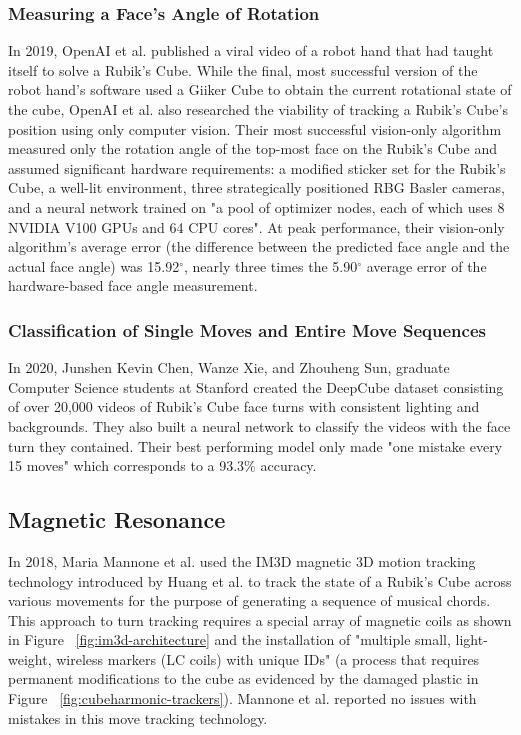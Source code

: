 \subsubsection{Measuring a Face's Angle of Rotation}
In 2019, OpenAI et al. published a viral video of a robot hand that had taught itself to solve a Rubik's Cube.
While the final, most successful version of the robot hand's software used a Giiker Cube to obtain the current rotational state of the cube, OpenAI et al. also researched the viability of tracking a Rubik's Cube's position using only computer vision.
Their most successful vision-only algorithm measured only the rotation angle of the top-most face on the Rubik's Cube and assumed significant hardware requirements: a modified sticker set for the Rubik's Cube, a well-lit environment, three strategically positioned RBG Basler cameras, and a neural network trained on "a pool of optimizer nodes, each of which uses 8 NVIDIA V100 GPUs and 64 CPU cores".
At peak performance, their vision-only algorithm's average error (the difference between the predicted face angle and the actual face angle) was 15.92$^\circ$, nearly three times the 5.90$^\circ$ average error of the hardware-based face angle measurement. \cite{openai2019rubiks}

\subsubsection{Classification of Single Moves and Entire Move Sequences}
In 2020, Junshen Kevin Chen, Wanze Xie, and Zhouheng Sun, graduate Computer Science students at Stanford created the DeepCube dataset consisting of over 20,000 videos of Rubik's Cube face turns with consistent lighting and backgrounds. 
They also built a neural network to classify the videos with the face turn they contained.
Their best performing model only made "one mistake every 15 moves" which corresponds to a 93.3\% accuracy. \cite{chendeepcube}


\subsection{Magnetic Resonance}
In 2018, Maria Mannone et al. used the IM3D magnetic 3D motion tracking technology introduced by Huang et al. \cite{im3d} to track the state of a Rubik's Cube across various movements for the purpose of generating a sequence of musical chords.
This approach to turn tracking requires a special array of magnetic coils as shown in Figure ~\ref{fig:im3d-architecture} and the installation of "multiple small, light-
weight, wireless markers (LC coils) with unique IDs" (a process that requires permanent modifications to the cube as evidenced by the damaged plastic in Figure ~\ref{fig:cubeharmonic-trackers}).
Mannone et al. reported no issues with mistakes in this move tracking technology. \cite{mannone-cubeharmonic-2018}

